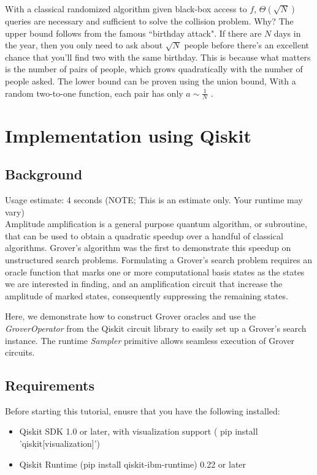 With a classical randomized algorithm given black-box access to $f$, $\Theta(\sqrt{N})$ queries are necessary and sufficient to solve the collision problem. Why? The upper bound follows from the famous ``birthday attack". If there are $N$ days in the year, then you only need to ask about $\sqrt{N}$ people before there's an excellent chance that you'll find two with the same birthday. This is because what matters is the number of pairs of people, which grows quadratically with the number of people asked. The lower bound can be proven using the union bound, With a random two-to-one function, each pair has only $a\sim \frac{1}{N}$ .

\section{Implementation using Qiskit}
\subsection{Background}
Usage estimate: 4 seconds (NOTE; This is an estimate only. Your runtime may vary)\\
Amplitude amplification is a general purpose quantum algorithm, or subroutine, that can be used to obtain a quadratic speedup over a handful of classical algorithms. Grover's algorithm was the first to demonstrate this speedup on unstructured search problems. Formulating a Grover's search problem requires an oracle function that marks one or more computational basis states as the states we are interested in finding, and an amplification circuit that increase the amplitude of marked states, consequently suppressing the remaining states.

Here, we demonstrate how to construct Grover oracles and use the \textit{GroverOperator} from the Qiskit circuit library to easily set up a Grover's search instance. The runtime \textit{Sampler} primitive allows seamless execution of Grover circuits.

\subsection{Requirements}
Before starting this tutorial, enusre that you have the following installed:
\begin{itemize}
    \item Qiskit SDK 1.0 or later, with visualization support ( pip install 'qiskit[visualization]')
    \item Qiskit Runtime (pip install qiskit-ibm-runtime) 0.22 or later
\end{itemize}

